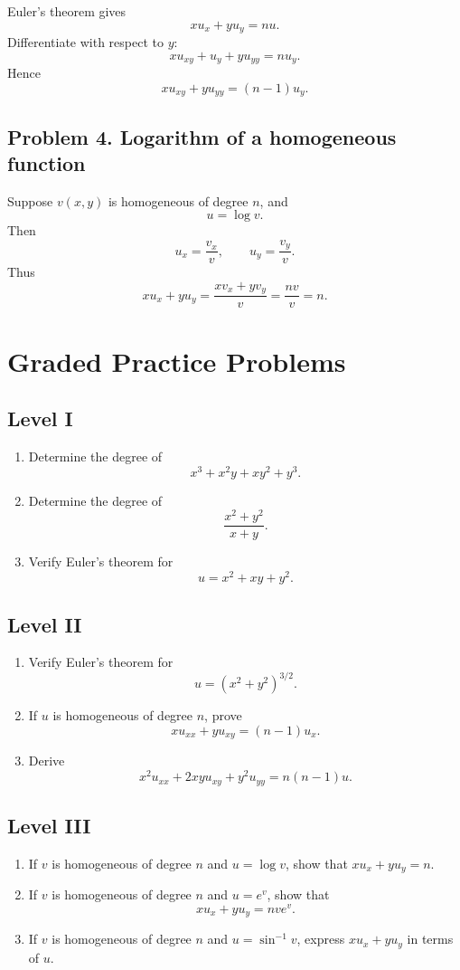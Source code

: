 \documentclass[11pt,oneside]{book}
\theoremstyle{studentthm}
\theoremstyle{definition}
\begin{document}
Euler's theorem gives
\[
xu_x+yu_y=nu.
\]
Differentiate with respect to \(y\):
\[
xu_{xy}+u_y+yu_{yy}=nu_y.
\]
Hence
\[
xu_{xy}+yu_{yy}=(n-1)u_y.
\]

\subsection*{Problem 4. Logarithm of a homogeneous function}
Suppose \(v(x,y)\) is homogeneous of degree \(n\), and
\[
u=\log v.
\]
Then
\[
u_x=\frac{v_x}{v},
\qquad
u_y=\frac{v_y}{v}.
\]
Thus
\[
xu_x+yu_y
=
\frac{xv_x+yv_y}{v}
=
\frac{nv}{v}
=
n.
\]

\section{Graded Practice Problems}

\subsection*{Level I}
\begin{enumerate}
\item Determine the degree of
\[
x^3+x^2y+xy^2+y^3.
\]
\item Determine the degree of
\[
\frac{x^2+y^2}{x+y}.
\]
\item Verify Euler's theorem for
\[
u=x^2+xy+y^2.
\]
\end{enumerate}

\subsection*{Level II}
\begin{enumerate}
\item Verify Euler's theorem for
\[
u=(x^2+y^2)^{3/2}.
\]
\item If \(u\) is homogeneous of degree \(n\), prove
\[
xu_{xx}+yu_{xy}=(n-1)u_x.
\]
\item Derive
\[
x^2u_{xx}+2xyu_{xy}+y^2u_{yy}=n(n-1)u.
\]
\end{enumerate}

\subsection*{Level III}
\begin{enumerate}
\item If \(v\) is homogeneous of degree \(n\) and \(u=\log v\),
show that \(xu_x+yu_y=n\).
\item If \(v\) is homogeneous of degree \(n\) and \(u=e^v\), show
that
\[
xu_x+yu_y=nve^v.
\]
\item If \(v\) is homogeneous of degree \(n\) and
\(u=\sin^{-1}v\), express \(xu_x+yu_y\) in terms of \(u\).
\end{enumerate}
\end{document}

